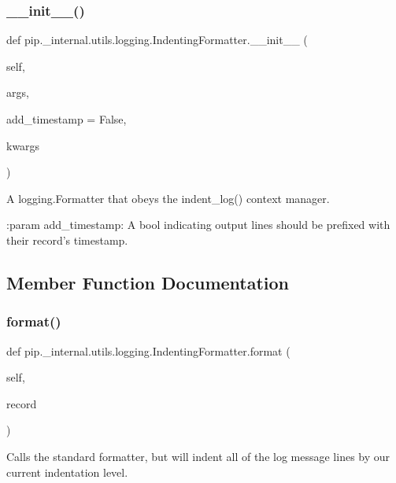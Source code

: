 \subsubsection{\texorpdfstring{\+\_\+\+\_\+init\+\_\+\+\_\+()}{\_\_init\_\_()}}
{\footnotesize\ttfamily def pip.\+\_\+internal.\+utils.\+logging.\+Indenting\+Formatter.\+\_\+\+\_\+init\+\_\+\+\_\+ (\begin{DoxyParamCaption}\item[{}]{self,  }\item[{}]{args,  }\item[{}]{add\+\_\+timestamp = {\ttfamily False},  }\item[{}]{kwargs }\end{DoxyParamCaption})}

\begin{DoxyVerb}A logging.Formatter that obeys the indent_log() context manager.

:param add_timestamp: A bool indicating output lines should be prefixed
    with their record's timestamp.
\end{DoxyVerb}
 

\subsection{Member Function Documentation}
\mbox{\label{classpip_1_1__internal_1_1utils_1_1logging_1_1IndentingFormatter_a5d4332f67f315773e40b095d9873f690}} 
\subsubsection{\texorpdfstring{format()}{format()}}
{\footnotesize\ttfamily def pip.\+\_\+internal.\+utils.\+logging.\+Indenting\+Formatter.\+format (\begin{DoxyParamCaption}\item[{}]{self,  }\item[{}]{record }\end{DoxyParamCaption})}

\begin{DoxyVerb}Calls the standard formatter, but will indent all of the log message
lines by our current indentation level.
\end{DoxyVerb}
 \mbox{\label{classpip_1_1__internal_1_1utils_1_1logging_1_1IndentingFormatter_afb5ccf6041a37cf3487c2b08bc31ef5f}} 
